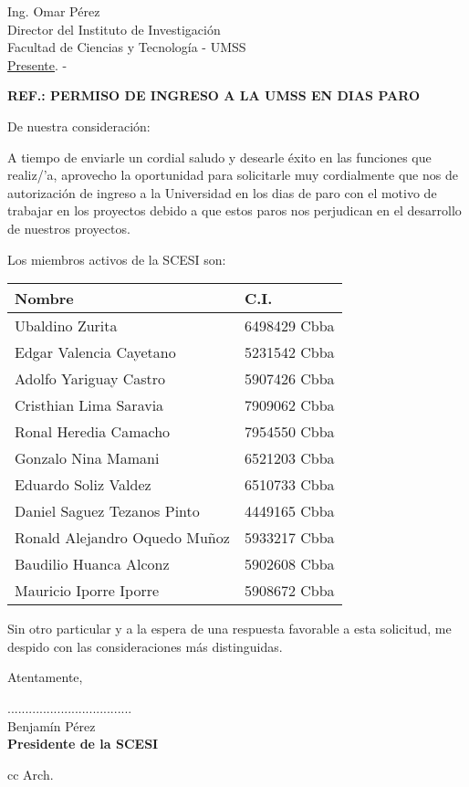\documentclass[letterpaper,12pt]{letter}
\begin{document}
\date {10 de octubre de 2011}
\begin{letter}{ Ing. Omar P\'erez \\ Director del Instituto de Investigaci\'on \\ Facultad de Ciencias y Tecnolog\'ia - UMSS \\ \underline {Presente}. -}

\begin{center}
	\opening{\textbf{REF.: PERMISO DE INGRESO A LA UMSS EN DIAS PARO}}
\end{center}

De nuestra consideración:

A tiempo de enviarle un cordial saludo y desearle éxito en las funciones que realiz/'a, aprovecho la oportunidad para solicitarle 
muy cordialmente que nos de autorizaci\'on de ingreso a la Universidad en los dias de paro con el motivo de trabajar en los proyectos
debido a que estos paros nos perjudican en el desarrollo de nuestros proyectos.

Los miembros activos de la SCESI son:

\begin{tabular}{|l|l|}
    \hline
    Nombre & C.I. \\
    \hline
    Ubaldino Zurita & 6498429 Cbba \\
    \hline
    Edgar Valencia Cayetano & 5231542 Cbba \\
    \hline
    Adolfo Yariguay Castro & 5907426 Cbba \\
    \hline
    Cristhian Lima Saravia & 7909062 Cbba \\
    \hline
    Ronal Heredia Camacho & 7954550 Cbba \\
    \hline
    Gonzalo Nina Mamani & 6521203 Cbba \\
    \hline
    Eduardo Soliz Valdez & 6510733 Cbba \\
    \hline
    Daniel Saguez Tezanos Pinto & 4449165 Cbba \\
    \hline
    Ronald Alejandro Oquedo Mu\~noz & 5933217 Cbba \\
    \hline
    Baudilio Huanca Alconz & 5902608 Cbba \\
    \hline
    Mauricio Iporre Iporre & 5908672 Cbba \\
    \hline
\end{tabular}

Sin otro particular y a la espera de una respuesta favorable a esta solicitud, me despido con las consideraciones más distinguidas.

Atentamente,

\vspace{4cm}

\begin{center}
...................................\\
Benjam\'in P\'erez\\
{\bfseries Presidente de la  SCESI}
\end{center}
\vspace{2cm}
cc Arch.
\end{letter}
\end{document}
